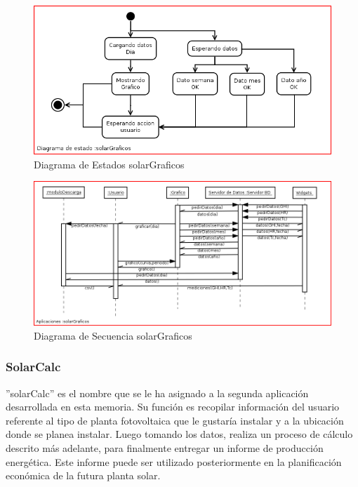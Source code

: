 \begin{figure}[h!]
        \centering
        \includegraphics[scale=0.5]{images/graficosEstados}
        \caption{Diagrama de Estados solarGraficos}
        \label{solarGraficoE}
\end{figure}

\begin{figure}[h!]
        \centering
        \includegraphics[scale=0.35]{images/graficosSecuencia}
        \caption{Diagrama de Secuencia solarGraficos}
        \label{solarGraficoS}
\end{figure}
\newpage

\subsubsection{SolarCalc}
''solarCalc'' es el nombre que se le ha asignado a la segunda aplicación desarrollada en esta memoria. Su función es recopilar información del usuario referente al tipo de planta fotovoltaica que le gustaría instalar y a la ubicación donde se planea instalar. Luego tomando los datos, realiza un proceso de cálculo descrito más adelante, para finalmente entregar un informe de producción energética. Este informe puede ser utilizado posteriormente en la planificación económica de la futura planta solar.\\

